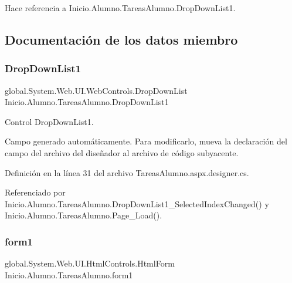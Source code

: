 \begin{DoxyCode}{0}
\end{DoxyCode}


Hace referencia a Inicio.\+Alumno.\+Tareas\+Alumno.\+Drop\+Down\+List1.



\subsection{Documentación de los datos miembro}
\mbox{\label{classInicio_1_1Alumno_1_1TareasAlumno_ac2aabbccda02faae4f64bcf85e100556}} 
\subsubsection{\texorpdfstring{DropDownList1}{DropDownList1}}
{\footnotesize\ttfamily global.\+System.\+Web.\+U\+I.\+Web\+Controls.\+Drop\+Down\+List Inicio.\+Alumno.\+Tareas\+Alumno.\+Drop\+Down\+List1\hspace{0.3cm}{\ttfamily [protected]}}



Control Drop\+Down\+List1. 

Campo generado automáticamente. Para modificarlo, mueva la declaración del campo del archivo del diseñador al archivo de código subyacente. 

Definición en la línea 31 del archivo Tareas\+Alumno.\+aspx.\+designer.\+cs.



Referenciado por Inicio.\+Alumno.\+Tareas\+Alumno.\+Drop\+Down\+List1\+\_\+\+Selected\+Index\+Changed() y Inicio.\+Alumno.\+Tareas\+Alumno.\+Page\+\_\+\+Load().

\mbox{\label{classInicio_1_1Alumno_1_1TareasAlumno_a9a9c1002686b25b5b81e64d6f49111be}} 
\subsubsection{\texorpdfstring{form1}{form1}}
{\footnotesize\ttfamily global.\+System.\+Web.\+U\+I.\+Html\+Controls.\+Html\+Form Inicio.\+Alumno.\+Tareas\+Alumno.\+form1\hspace{0.3cm}{\ttfamily [protected]}}



